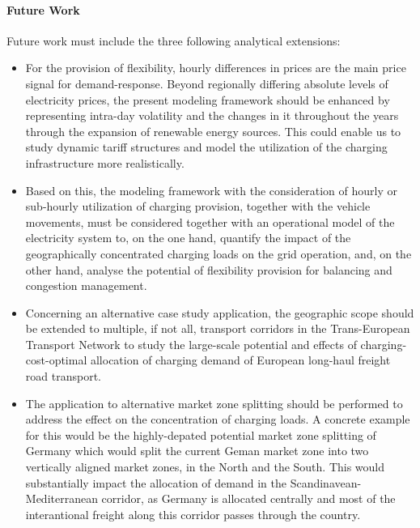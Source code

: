 \documentclass[preprint,10pt,review, authoryear]{elsarticle}
\begin{document}
    \paragraph{Future Work}
        Future work must include the three following analytical extensions:
        \begin{itemize}
            \item For the provision of flexibility, hourly differences in prices are the main price signal for demand-response. Beyond regionally differing absolute levels of electricity prices, the present modeling framework should be enhanced by representing intra-day volatility and the changes in it throughout the years through the expansion of renewable energy sources. This could enable us to study dynamic tariff structures and model the utilization of the charging infrastructure more realistically.

            \item Based on this, the modeling framework with the consideration of hourly or sub-hourly utilization of charging provision, together with the vehicle movements, must be considered together with an operational model of the electricity system to, on the one hand, quantify the impact of the geographically concentrated charging loads on the grid operation, and, on the other hand, analyse the potential of flexibility provision for balancing and congestion management.
            
            \item Concerning an alternative case study application, the geographic scope should be extended to multiple, if not all, transport corridors in the Trans-European Transport Network to study the large-scale potential and effects of charging-cost-optimal allocation of charging demand of European long-haul freight road transport. 

            \item The application to alternative market zone splitting should be performed to address the effect on the concentration of charging loads. A concrete example for this would be the highly-depated potential market zone splitting of Germany which would split the current Geman market zone into two vertically aligned market zones, in the North and the South. This would substantially impact the allocation of demand in the Scandinavean-Mediterranean corridor, as Germany is allocated centrally and most of the interantional freight along this corridor passes through the country.
        \end{itemize}
        
\end{document}
